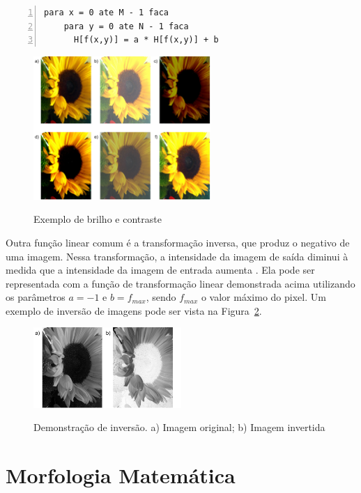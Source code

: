 \documentclass[12pt,oneside,a4paper,english,french,spanish,brazil,]{abntex2}
\begin{document}
\begin{lstlisting}[caption={Algoritmo para aplicação de brilho e contraste}, label=alg:Brilho_Contraste, numbers=left]
para x = 0 ate M - 1 faca
    para y = 0 ate N - 1 faca
      H[f(x,y)] = a * H[f(x,y)] + b
\end{lstlisting}

\begin{figure}[ht]
\centering
\caption{Exemplo de brilho e contraste}
\includegraphics[width=0.6\textwidth]{imagens/PDI_Brilho_e_Contraste.pdf}
\sourceAuthor
\label{fig:PDI_Brilho_e_Contraste}
\end{figure}

Outra função linear comum é a transformação inversa, que produz o negativo de uma imagem. Nessa transformação, a intensidade da imagem de saída diminui à medida que a intensidade da imagem de entrada aumenta \cite{pedrini:2008}. Ela pode ser representada com a função de transformação linear demonstrada acima utilizando os parâmetros \(a=-1\) e \(b=f_{max}\), sendo \(f_{max}\) o valor máximo do pixel. Um exemplo de inversão de imagens pode ser vista na Figura~\ref{fig:PDI_Inversao}.

\begin{figure}[ht]
\centering
\caption{Demonstração de inversão. a) Imagem original; b) Imagem invertida}
\includegraphics[width=0.5\textwidth]{imagens/PDI_Inversao.pdf}
\sourceAuthor
\label{fig:PDI_Inversao}
\end{figure}

\section{Morfologia Matemática}
\end{document}
